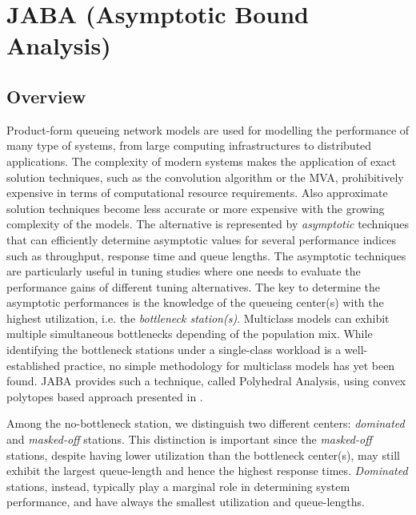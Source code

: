 %
%
%
%
%
\chapter{JABA (Asymptotic Bound Analysis)}
\label{cha:jaba}
\section{Overview}
Product-form queueing network models are used for modelling the
performance of many type of systems, from large computing
infrastructures to distributed applications. The complexity of
modern systems makes the application of exact solution techniques,
such as the convolution algorithm or the MVA, prohibitively
expensive in terms of computational resource requirements. Also
approximate solution techniques become less accurate or more
expensive with the growing complexity of the models. The
alternative is represented by \emph{asymptotic} techniques that
can efficiently determine asymptotic values for several
performance indices such as throughput, response time and queue
lengths. The asymptotic techniques are particularly useful in
tuning studies where one needs to evaluate the performance gains
of different tuning alternatives. The key to determine the
asymptotic performances is the knowledge of the queueing center(s)
with the highest utilization, i.e. the \emph{bottleneck
station(s)}. Multiclass models can exhibit multiple simultaneous
bottlenecks depending of the population mix. While identifying the
bottleneck stations under a single-class workload is a
well-established practice, no simple methodology for multiclass
models has yet been found. JABA provides such a technique, called
Polyhedral Analysis, using convex polytopes based approach
presented in \cite{polytopes}.

Among the no-bottleneck station, we distinguish two different
centers: \emph{dominated} and \emph{masked-off} stations. This
distinction is important since the \emph{masked-off} stations,
despite having lower utilization than the bottleneck center(s),
may still exhibit the largest queue-length and hence the highest
response times. \emph{Dominated} stations, instead, typically play
a marginal role in determining system performance, and have always
the smallest utilization and queue-lengths.


